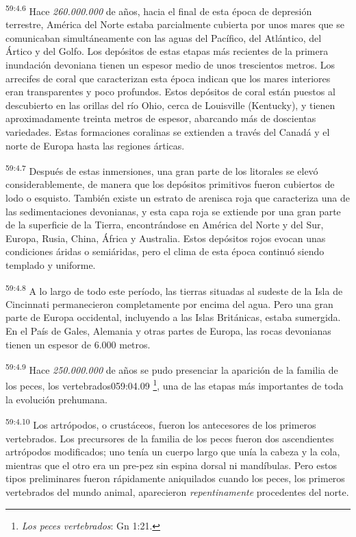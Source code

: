 \par
\textsuperscript{59:4.6} Hace \textit{260.000.000} de años, hacia el final de esta época de depresión terrestre, América del Norte estaba parcialmente cubierta por unos mares que se comunicaban simultáneamente con las aguas del Pacífico, del Atlántico, del Ártico y del Golfo. Los depósitos de estas etapas más recientes de la primera inundación devoniana tienen un espesor medio de unos trescientos metros. Los arrecifes de coral que caracterizan esta época indican que los mares interiores eran transparentes y poco profundos. Estos depósitos de coral están puestos al descubierto en las orillas del río Ohio, cerca de Louisville
(Kentucky), y tienen aproximadamente treinta metros de espesor, abarcando más de doscientas variedades. Estas formaciones coralinas se extienden a través del Canadá y el norte de Europa hasta las regiones árticas.

\par
\textsuperscript{59:4.7} Después de estas inmersiones, una gran parte de los litorales se elevó considerablemente, de manera que los depósitos primitivos fueron cubiertos de lodo o esquisto. También existe un estrato de arenisca roja que caracteriza una de las sedimentaciones devonianas, y esta capa roja se extiende por una gran parte de la superficie de la Tierra, encontrándose en América del Norte y del Sur, Europa, Rusia, China, África y Australia. Estos depósitos rojos evocan unas condiciones áridas o semiáridas, pero el clima de esta época continuó siendo templado y uniforme.

\par
\textsuperscript{59:4.8} A lo largo de todo este período, las tierras situadas al sudeste de la Isla de Cincinnati permanecieron completamente por encima del agua. Pero una gran parte de Europa occidental, incluyendo a las Islas Británicas, estaba sumergida. En el País de Gales, Alemania y otras partes de Europa, las rocas devonianas tienen un espesor de 6.000 metros.

\par
\textsuperscript{59:4.9} Hace \textit{250.000.000} de años se pudo presenciar la aparición de la familia de los peces, los vertebrados059:04.09 \footnote{\textit{Los peces vertebrados}: Gn 1:21.}, una de las etapas más importantes de toda la evolución prehumana.

\par
\textsuperscript{59:4.10} Los artrópodos, o crustáceos, fueron los antecesores de los primeros vertebrados. Los precursores de la familia de los peces fueron dos ascendientes artrópodos modificados; uno tenía un cuerpo largo que unía la cabeza y la cola, mientras que el otro era un pre-pez sin espina dorsal ni mandíbulas. Pero estos tipos preliminares fueron rápidamente aniquilados cuando los peces, los primeros vertebrados del mundo animal, aparecieron \textit{repentinamente} procedentes del norte.

